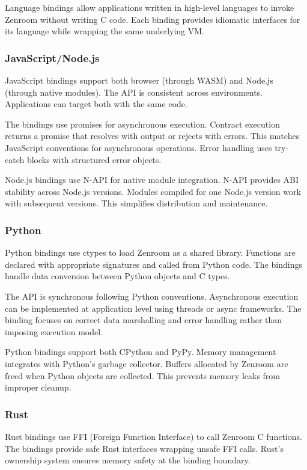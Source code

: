 Language bindings allow applications written in high-level languages
to invoke Zenroom without writing C code. Each binding provides
idiomatic interfaces for its language while wrapping the same
underlying VM.

\subsubsection{JavaScript/Node.js}

JavaScript bindings support both browser (through WASM) and Node.js
(through native modules). The API is consistent across
environments. Applications can target both with the same code.

The bindings use promises for asynchronous execution. Contract
execution returns a promise that resolves with output or rejects with
errors. This matches JavaScript conventions for asynchronous
operations. Error handling uses try-catch blocks with structured error
objects.

Node.js bindings use N-API for native module integration. N-API
provides ABI stability across Node.js versions. Modules compiled for
one Node.js version work with subsequent versions. This simplifies
distribution and maintenance.

\subsubsection{Python}

Python bindings use ctypes to load Zenroom as a shared
library. Functions are declared with appropriate signatures and called
from Python code. The bindings handle data conversion between Python
objects and C types.

The API is synchronous following Python conventions. Asynchronous
execution can be implemented at application level using threads or
async frameworks. The binding focuses on correct data marshalling and
error handling rather than imposing execution model.

Python bindings support both CPython and PyPy. Memory management
integrates with Python's garbage collector. Buffers allocated by
Zenroom are freed when Python objects are collected. This prevents
memory leaks from improper cleanup.

\subsubsection{Rust}

Rust bindings use FFI (Foreign Function Interface) to call Zenroom C
functions. The bindings provide safe Rust interfaces wrapping unsafe
FFI calls. Rust's ownership system ensures memory safety at the
binding boundary.

